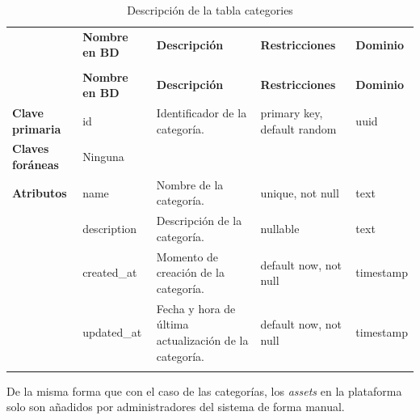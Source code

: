 \renewcommand{\arraystretch}{1.35}
\setlength{\tabcolsep}{3pt}
\small

\begin{longtable}{|
>{\raggedright\arraybackslash}p{1.9cm}|
>{\raggedright\arraybackslash}p{2.7cm}|
>{\raggedright\arraybackslash}p{4.9cm}|
>{\raggedright\arraybackslash}p{2.7cm}|
>{\raggedright\arraybackslash}p{2.1cm}|
}
\hline

\rowcolor[gray]{0.75}
\multicolumn{5}{|c|}{\textbf{Categorías}} \\
\hline

 & \textbf{Nombre en BD} & \textbf{Descripción} & \textbf{Restricciones} & \textbf{Dominio} \\
\hline
\endfirsthead

\hline
\rowcolor[gray]{0.75}
\multicolumn{5}{|c|}{\textbf{Categorías}} \\
\hline

 & \textbf{Nombre en BD} & \textbf{Descripción} & \textbf{Restricciones} & \textbf{Dominio} \\
\hline
\endhead

\textbf{Clave primaria}
& id
& Identificador de la categoría.
& primary key, default random
& uuid \\
\hline

\textbf{Claves foráneas}
& Ninguna
& 
& 
&  \\
\hline

\textbf{Atributos}
& name
& Nombre de la categoría.
& unique, not null
& text \\
\cline{2-5}

& description
& Descripción de la categoría.
& nullable
& text \\
\cline{2-5}

& created\_\allowbreak at
& Momento de creación de la categoría.
& default now, not null
& timestamp \\
\cline{2-5}

& updated\_\allowbreak at
& Fecha y hora de última actualización de la categoría.
& default now, not null
& timestamp \\
\hline

\caption{Descripción de la tabla categories}
\end{longtable}




De la misma forma que con el caso de las categorías, los \textit{assets} en la plataforma solo son añadidos por administradores del sistema de forma manual. 

